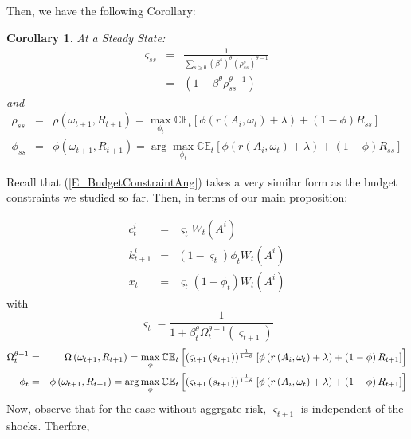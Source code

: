 \documentclass{article}
\newtheorem{corollary}[theorem]{Corollary}
\begin{document}
Then, we have the following Corollary:

\begin{corollary}
At a Steady State:%
\begin{eqnarray*}
\varsigma _{ss} &=&\frac{1}{\sum_{s\geq 0}\left( \beta ^{s}\right) ^{\theta
}\left( \rho _{ss}^{s}\right) ^{\theta -1}} \\
&=&\left( 1-\beta ^{\theta }\rho _{ss}^{\theta -1}\right)
\end{eqnarray*}%
and
\begin{eqnarray*}
\rho _{ss} &=&\rho \left( \omega _{t+1},R_{t+1}\right) =\max_{\phi _{t}}%
\mathbb{CE}_{t}\left[ \phi \left( r\left( A_{i},\omega _{t}\right) +\lambda
\right) +\left( 1-\phi \right) R_{ss}\right] \\
\phi _{ss} &=&\phi \left( \omega _{t+1},R_{t+1}\right) =\arg \max_{\phi _{t}}%
\mathbb{CE}_{t}\left[ \phi \left( r\left( A_{i},\omega _{t}\right) +\lambda
\right) +\left( 1-\phi \right) R_{ss}\right]
\end{eqnarray*}
\end{corollary}

Recall that (\ref{E_BudgetConstraintAng}) takes a very similar form as the
budget constraints we studied so far. Then, in terms of our main proposition:

\begin{eqnarray*}
c_{t}^{i} &=&\varsigma _{t}W_{t}\left( A^{i}\right) \\
k_{t+1}^{i} &=&\left( 1-\varsigma _{t}\right) \phi _{t}W_{t}\left(
A^{i}\right) \\
x_{t} &=&\varsigma _{t}\left( 1-\phi _{t}\right) W_{t}\left( A^{i}\right)
\end{eqnarray*}%
with
\begin{equation*}
\varsigma _{t}=\frac{1}{1+\beta _{t}^{\theta }\Omega _{t}^{\theta -1}\left(
\varsigma _{t+1}\right) }
\end{equation*}%
\begin{eqnarray*}
\Omega _{t}^{\theta -1} &=&\Omega \left( \omega _{t+1},R_{t+1}\right)
=\max_{\phi }\mathbb{CE}_{t}\left[ \left( \varsigma _{t+1}\left(
s_{t+1}\right) \right) ^{\frac{1}{1-\theta }}\left[ \phi \left( r\left(
A_{i},\omega _{t}\right) +\lambda \right) +\left( 1-\phi \right) R_{t+1}%
\right] \right] \\
\phi _{t} &=&\phi \left( \omega _{t+1},R_{t+1}\right) =\arg \max_{\phi }%
\mathbb{CE}_{t}\left[ \left( \varsigma _{t+1}\left( s_{t+1}\right) \right) ^{%
\frac{1}{1-\theta }}\left[ \phi \left( r\left( A_{i},\omega _{t}\right)
+\lambda \right) +\left( 1-\phi \right) R_{t+1}\right] \right]
\end{eqnarray*}%
Now, observe that for the case without aggrgate risk, $\varsigma _{t+1}$ is
independent of the shocks. Therfore,
\end{document}
